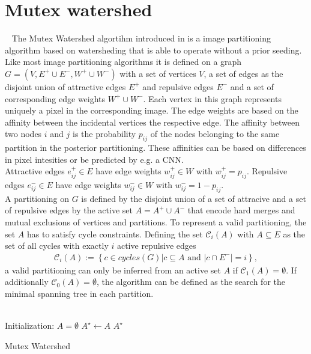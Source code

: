 \section{Mutex watershed}~\label{sec:mtx_wtsd}
The Mutex Watershed algortihm introduced in \cite{wolf2019mutex} is a image partitioning algorithm based on watersheding that is able to operate without a prior seeding.\\
Like most image partitioning algorithms it is defined on a graph $G=(V, E^+ \cup E^-, W^+ \cup W^-)$ with a set of vertices $V$, a set of edges as the disjoint union of attractive edges $E^+$ and repulsive edges $E^-$ and a set of corresponding edge weights $ W^+ \cup W^-$. Each vertex in this graph represents uniquely a pixel in the corresponding image. The edge weights are based on the affinity between the incidental vertices the respective edge. The affinity between two nodes $i$ and $j$ is the probability $p_{ij}$ of the nodes belonging to the same partition in the posterior partitioning. These affinities can be based on differences in pixel intesities or be predicted by e.g. a CNN. \\
Attractive edges $e_{ij}^+ \in E$ have edge weights $w_{ij}^+ \in W$ with $w_{ij}^+ = p_{ij}$. Repulsive edges $e_{ij}^- \in E$ have edge weights $w_{ij}^- \in W$ with $w_{ij}^- = 1-p_{ij}$. \\
A partitioning on $G$ is defined by the disjoint union of a set of attracive and a set of repulsive edges by the active set $A=A^+ \cup A^-$ that encode hard merges and mutual exclusions of vertices and partitions. To represent a valid partitioning, the set $A$ has to satisfy cycle constraints. Defining the set $\mathcal{C}_i(A)$  with $A\subseteq E$ as the set of all cycles with exactly $i$ active repulsive edges
\begin{align}
	\mathcal{C}_i(A) := \left\{ c \in cycles(G) \vert c \subseteq A \text{  and  } |c \cap E^- | = i \right\},
\end{align}
a valid partitioning can only be inferred from an active set $A$ if $\mathcal{C}_1(A) = \emptyset $. If additionally $\mathcal{C}_0(A) = \emptyset $, the algorithm can be defined as the search for the minimal spanning tree in each partition.\\
\vspace{8mm}\\
\begin{algorithm}[H]
	Initialization: $A = \emptyset$\;
	$A^\star \leftarrow A$ \;
	\Return $A^\star$
	\caption{Mutex Watershed \cite{wolf2019mutex}}
	\label{algo:mtx_wtsd}
\end{algorithm}
\vspace{8mm}

